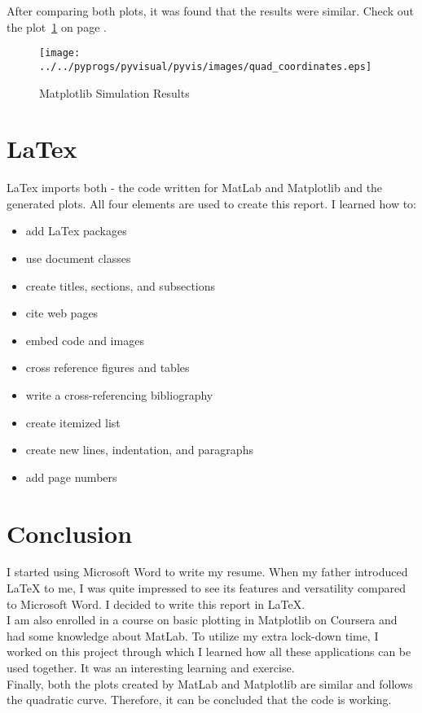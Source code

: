 \documentclass{article}
\begin{document}
After comparing both plots, it was found that the results were similar. Check out the plot~\ref{fig:matplotlibfigure} on page \pageref{fig:matplotlibfigure}.

\begin{figure}[h]
    \centering
        \texttt{[image: ../../pyprogs/pyvisual/pyvis/images/quad\_coordinates.eps]} 
    \caption{Matplotlib Simulation Results}
    \label{fig:matplotlibfigure}
\end{figure}

\section{LaTex}
LaTex imports both - the code written for MatLab and Matplotlib and the generated plots. All four elements are used to create this report. I learned how to:
\begin{itemize}
	\item add LaTex packages
	\item use document classes
	\item create titles, sections, and subsections
	\item cite web pages
	\item embed code and images
	\item cross reference figures and tables
	\item write a cross-referencing bibliography
	\item create itemized list
	\item create new lines, indentation, and paragraphs
	\item add page numbers
\end{itemize}

\section{Conclusion}
I started using Microsoft Word to write my resume. When my father introduced LaTeX to me, I was quite impressed to see its features and versatility compared to Microsoft Word. I decided to write this report in LaTeX. \\

I am also enrolled in a course on basic plotting in Matplotlib on Coursera and had some knowledge about MatLab. To utilize my extra lock-down time, I worked on this project through which I learned how all these applications can be used together. It was an interesting learning and exercise.\\

Finally, both the plots created by MatLab and Matplotlib are similar and follows the quadratic curve. Therefore, it can be concluded that the code is working. \\


 

\end{document}
